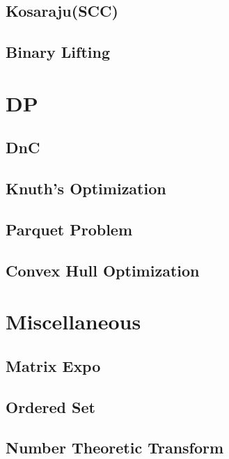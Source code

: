 \documentclass[a4paper, twocolumn]{article}
\begin{document}
\subsection{Kosaraju(SCC)}

\subsection{Binary Lifting}


\section{DP}
\subsection{DnC} 

\subsection{Knuth's Optimization}

\subsection{Parquet Problem}

\subsection{Convex Hull Optimization}


\section{Miscellaneous}
\subsection{Matrix Expo}

\subsection{Ordered Set}

\subsection{Number Theoretic Transform}

\end{document}
